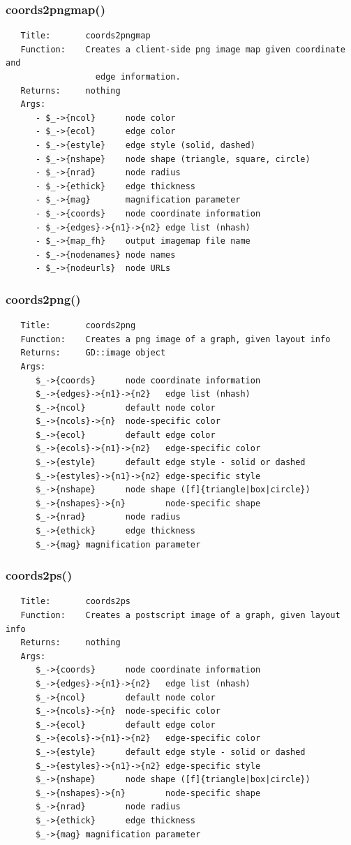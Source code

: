 \documentclass{article}
\begin{document}
\subsubsection*{coords2pngmap()\label{LGL_pm_coords2pngmap_}}
\begin{verbatim}
   Title:       coords2pngmap
   Function:    Creates a client-side png image map given coordinate and
                  edge information. 
   Returns:     nothing
   Args:
      - $_->{ncol}      node color
      - $_->{ecol}      edge color
      - $_->{estyle}    edge style (solid, dashed)
      - $_->{nshape}    node shape (triangle, square, circle)
      - $_->{nrad}      node radius
      - $_->{ethick}    edge thickness
      - $_->{mag}       magnification parameter
      - $_->{coords}    node coordinate information
      - $_->{edges}->{n1}->{n2} edge list (nhash)
      - $_->{map_fh}    output imagemap file name
      - $_->{nodenames} node names
      - $_->{nodeurls}  node URLs
\end{verbatim}
\subsubsection*{coords2png()\label{LGL_pm_coords2png_}}
\begin{verbatim}
   Title:       coords2png
   Function:    Creates a png image of a graph, given layout info
   Returns:     GD::image object
   Args:
      $_->{coords}      node coordinate information
      $_->{edges}->{n1}->{n2}   edge list (nhash)
      $_->{ncol}        default node color
      $_->{ncols}->{n}  node-specific color
      $_->{ecol}        default edge color
      $_->{ecols}->{n1}->{n2}   edge-specific color
      $_->{estyle}      default edge style - solid or dashed
      $_->{estyles}->{n1}->{n2} edge-specific style
      $_->{nshape}      node shape ([f]{triangle|box|circle})
      $_->{nshapes}->{n}        node-specific shape
      $_->{nrad}        node radius
      $_->{ethick}      edge thickness
      $_->{mag} magnification parameter
\end{verbatim}
\subsubsection*{coords2ps()\label{LGL_pm_coords2ps_}}
\begin{verbatim}
   Title:       coords2ps
   Function:    Creates a postscript image of a graph, given layout info
   Returns:     nothing
   Args:
      $_->{coords}      node coordinate information
      $_->{edges}->{n1}->{n2}   edge list (nhash)
      $_->{ncol}        default node color
      $_->{ncols}->{n}  node-specific color
      $_->{ecol}        default edge color
      $_->{ecols}->{n1}->{n2}   edge-specific color
      $_->{estyle}      default edge style - solid or dashed
      $_->{estyles}->{n1}->{n2} edge-specific style
      $_->{nshape}      node shape ([f]{triangle|box|circle})
      $_->{nshapes}->{n}        node-specific shape
      $_->{nrad}        node radius
      $_->{ethick}      edge thickness
      $_->{mag} magnification parameter
\end{verbatim}
\end{document}
